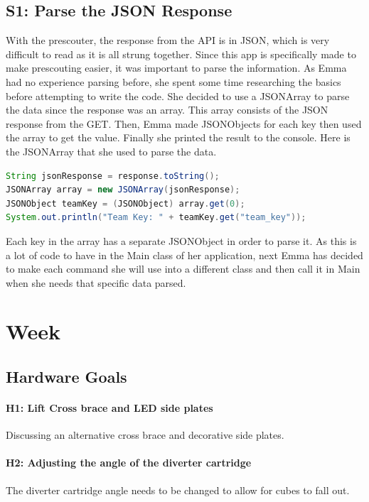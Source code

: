 \documentclass{article}
\begin{document}
\subsection{S1: Parse the JSON Response}

With the prescouter, the response from the API is in JSON, which is very difficult to read as it is all strung together. Since this app is specifically made to make prescouting easier, it was important to parse the information. As Emma had no experience parsing before, she spent some time researching the basics before attempting to write the code. She decided to use a JSONArray to parse the data since the response was an array. This array consists of the JSON response from the GET. Then, Emma made JSONObjects for each key then used the array to get the value. Finally she printed the result to the console. Here is the JSONArray that she used to parse the data. 

\begin{lstlisting}[language=Java]
String jsonResponse = response.toString();
JSONArray array = new JSONArray(jsonResponse);
JSONObject teamKey = (JSONObject) array.get(0);
System.out.println("Team Key: " + teamKey.get("team_key"));

\end{lstlisting}

Each key in the array has a separate JSONObject in order to parse it. As this is a lot of code to have in the Main class of her application, next Emma has decided to make each command she will use into a different class and then call it in Main when she needs that specific data parsed. 
\clearpage \newpage \section{Week \thesection} 
\subsection{Hardware Goals}
\paragraph{H1: Lift Cross brace and LED side plates}
 Discussing an alternative cross brace and decorative side plates.
\paragraph{H2: Adjusting the angle of the diverter cartridge}
 The diverter cartridge angle needs to be changed to allow for cubes to fall out.
\end{document}

